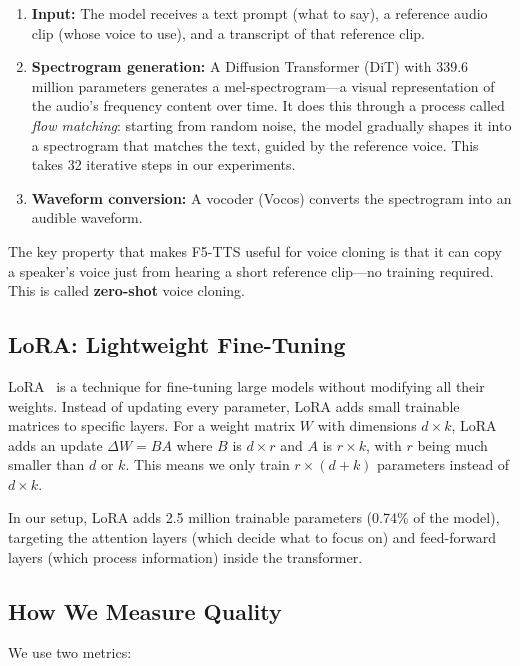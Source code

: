 \documentclass[11pt, a4paper]{article}
\begin{document}
\begin{enumerate}[itemsep=4pt]
    \item \textbf{Input:} The model receives a text prompt (what to say), a reference audio clip (whose voice to use), and a transcript of that reference clip.

    \item \textbf{Spectrogram generation:} A Diffusion Transformer (DiT) with 339.6 million parameters generates a mel-spectrogram---a visual representation of the audio's frequency content over time. It does this through a process called \emph{flow matching}: starting from random noise, the model gradually shapes it into a spectrogram that matches the text, guided by the reference voice. This takes 32 iterative steps in our experiments.

    \item \textbf{Waveform conversion:} A vocoder (Vocos) converts the spectrogram into an audible waveform.
\end{enumerate}

The key property that makes F5-TTS useful for voice cloning is that it can copy a speaker's voice just from hearing a short reference clip---no training required. This is called \textbf{zero-shot} voice cloning.

\subsection{LoRA: Lightweight Fine-Tuning}

LoRA~\citep{hu2022lora} is a technique for fine-tuning large models without modifying all their weights. Instead of updating every parameter, LoRA adds small trainable matrices to specific layers. For a weight matrix $W$ with dimensions $d \times k$, LoRA adds an update $\Delta W = BA$ where $B$ is $d \times r$ and $A$ is $r \times k$, with $r$ being much smaller than $d$ or $k$. This means we only train $r \times (d + k)$ parameters instead of $d \times k$.

In our setup, LoRA adds 2.5 million trainable parameters (0.74\% of the model), targeting the attention layers (which decide what to focus on) and feed-forward layers (which process information) inside the transformer.

\subsection{How We Measure Quality}

We use two metrics:
\end{document}
